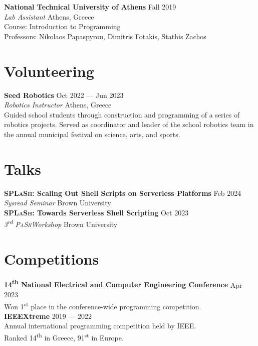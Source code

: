 \documentclass[margin, 12pt]{resume}
\newcommand{\pash}{\textsc{PaSh}}
\newcommand{\sectionVSpace}{\vspace{-3.5ex}} %
\newcommand{\splash}{\textsc{SPLaSh}\xspace}
\newcommand{\competition}[1]{\textbf{#1}\xspace}
\newcommand{\event}[1]{\textit{#1}\xspace}
\newcommand{\institution}[1]{\textbf{#1}\xspace}
\newcommand{\ordinal}[1]{\textsuperscript{#1}\xspace}
\newcommand{\rSection}[1]{\sectionVSpace\section{#1}\xspace}
\newcommand{\role}[1]{\textit{#1}\xspace}
\newcommand{\stitle}[1]{#1:\xspace}
\newcommand{\talk}[1]{\textbf{#1}\xspace}
\begin{document}
\begin{resume}
    \institution{National Technical University of Athens} \hfill Fall 2019 \\
    \role{Lab Assistant} \hfill Athens, Greece \\
    \stitle{Course} Introduction to Programming \\
    \stitle{Professors} Nikolaos Papaspyrou, Dimitris Fotakis, Stathis Zachos \\

    \rSection{Volunteering}

    \institution{Seed Robotics} \hfill Oct 2022 --- Jun 2023 \\
    \role{Robotics Instructor} \hfill Athens, Greece \\
    Guided school students through construction and programming of a series of robotics projects. Served as coordinator and leader of the school robotics team in the annual municipal festival on science, arts, and sports. \\

    \rSection{Talks}


    \talk{\splash: Scaling Out Shell Scripts on Serverless Platforms} \hfill Feb 2024 \\
    \event{Sysread Seminar} \hfill Brown University \\


    \talk{\splash: Towards Serverless Shell Scripting} \hfill Oct 2023 \\
    \event{3\ordinal{rd} \pash Workshop} \hfill Brown University \\

    \rSection{Competitions}

    \competition{14\ordinal{th} National Electrical and Computer Engineering Conference} \hfill Apr 2023 \\
    Won 1\ordinal{st} place in the conference-wide programming competition. \\

    \competition{IEEEXtreme} \hfill 2019 --- 2022 \\
    Annual international programming competition held by IEEE. \\
    Ranked 14\ordinal{th} in Greece, 91\ordinal{st} in Europe. \\


\end{resume}
\end{document}
